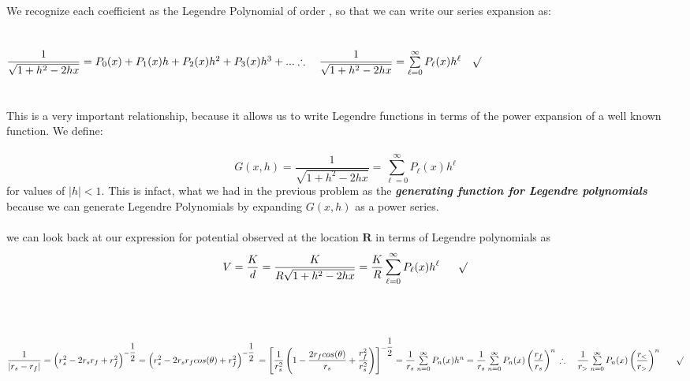 \documentclass[fleqn]{article}
\begin{document}
\begin{enumerate}
{      \\
      \\
      We recognize each coefficient as the Legendre Polynomial of order , so that we can write our series expansion as: \\
      \\
      \\
      $
        \dfrac{1}{\sqrt{1+h^2-2hx}}=P_0(x)+P_1(x)h+P_2(x)h^2+P_3(x) h^3+... \\
        \\
        \\
        \therefore ~~~ \dfrac{1}{\sqrt{1+h^2-2hx}}=\sum\limits_{\ell=0}^{\infty} P_{\ell}(x) h^{\ell} ~~~ \surd
      $ \\
      \\
      \\
      This is a very important relationship, because it allows us to write Legendre functions in
      terms of the power expansion of a well known function. We define: \\
      \\
      $$G(x,h)=\dfrac{1}{\sqrt{1+h^2-2hx}}=\sum\limits_{\ell=0}^{\infty} P_{\ell}(x) h^{\ell}$$
      for values of $|h|<1$. This is infact, what we had in the previous problem as the 
      \emph{\textbf{generating function for Legendre polynomials}} because we can
      generate Legendre Polynomials by expanding $G(x,h)$ as a power series. \\
      \\
      we can look back at our expression for potential observed at the location $\mathbf{R}$ in terms
      of Legendre polynomials as
      $$V=\dfrac{K}{d}=\dfrac{K}{R\sqrt{1+h^2-2hx}}=\dfrac{K}{R} \sum\limits_{\ell=0}^{\infty} P_{\ell}(x) h^{\ell} ~~~~~ \surd$$
      \\
      \\
      \\
      $
        \dfrac{1}{|r_s-r_f|}=\left(r^2_s-2r_s r_f+r^2_f\right)^{-\dfrac{1}{2}}=\left(r^2_s-2r_s r_f cos(\theta)+r^2_f\right)^{-\dfrac{1}{2}} \\
        \\
        \\
        =\left[\dfrac{1}{r^2_s}  \left(1-\dfrac{2r_f cos(\theta)}{r_s}+\dfrac{r^2_f}{r^2_s}\right)\right]^{-\dfrac{1}{2}}
        =\dfrac{1}{r_s} \sum\limits_{n=0}^{\infty} P_n(x) h^n=\dfrac{1}{r_s} \sum\limits_{n=0}^{\infty} P_n(x) \left(\dfrac{r_f}{r_s}\right)^n \\
        \\
        \\
        \\
        \therefore ~~~ \dfrac{1}{r_{>}} \sum\limits_{n=0}^{\infty} P_n(x) \left(\dfrac{r_{<}}{r_{>}}\right)^n  ~~~~~ \surd
      $
    }

  \end{enumerate}
\end{document}
